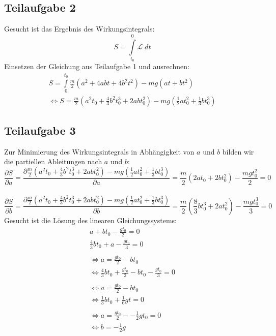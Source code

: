 \documentclass[a4paper,german,12pt,smallheadings]{scrartcl}
\begin{document}
\subsection*{Teilaufgabe 2}
Gesucht ist das Ergebnis des Wirkungsintegrals:
\begin{equation}
S=\int\limits_{t_0}^{0} \mathcal{L} \; dt
\end{equation}
Einsetzen der Gleichung aus Teilaufgabe 1 und ausrechnen:
\begin{align*}
S=\int\limits_{0}^{t_0} \frac{m}{2} \left(a^2+4abt+4b^2t^2\right) - mg\left(at+bt^2\right)\\
\Leftrightarrow S=\frac{m}{2} \left(a^2t_0+\frac{4}{3}b^2t_0^3+2abt_0^2\right)-mg\left(\frac{1}{2} at_0^2+ \frac{1}{3} bt_0^3\right)
\end{align*}
\subsection*{Teilaufgabe 3}
Zur Minimierung des Wirkungsintegrals in Abhängigkeit von $a$ und $b$ bilden wir die partiellen Ableitungen nach $a$ und $b$:
\begin{equation}
\frac{\partial S}{\partial a}=\frac{\partial \frac{m}{2} \left(a^2t_0+\frac{4}{3}b^2t_0^3+2abt_0^2\right)-mg\left(\frac{1}{2} at_0^2+ \frac{1}{3} bt_0^3\right)}{\partial a}=\frac{m}{2}\left(2at_0+2bt_0^2\right)-\frac{mgt_0^2}{2}=0
\end{equation}
\\
\begin{equation}
\frac{\partial S}{\partial b}=\frac{\partial \frac{m}{2} \left(a^2t_0+\frac{4}{3}b^2t_0^3+2abt_0^2\right)-mg\left(\frac{1}{2} at_0^2+ \frac{1}{3} bt_0^3\right)}{\partial b}=\frac{m}{2}\left(\frac{8}{3}bt_0^3+2at_0^2\right)-\frac{mgt_0^3}{3}=0
\end{equation}
Gesucht ist die Lösung des linearen Gleichungssystems:
\begin{align*}
a+bt_0-\frac{gt_0}{2}=0\\
\frac{4}{3}bt_0+a-\frac{gt_0}{3}=0\\
\\
\Leftrightarrow a=\frac{gt_0}{2}-bt_0\\
\Leftrightarrow \frac{4}{3}bt_0+\frac{gt_0}{2}-bt_0-\frac{gt_0}{3}=0\\
\\
\Leftrightarrow a=\frac{gt_0}{2}-bt_0\\
\Leftrightarrow \frac{1}{3}bt_0+\frac{1}{6}gt=0\\
\\
\Leftrightarrow a=\frac{gt_0}{2}--\frac{1}{2}gt_0=0\\
\Leftrightarrow b=-\frac{1}{2}g\\
\\
\end{align*}
\end{document}
